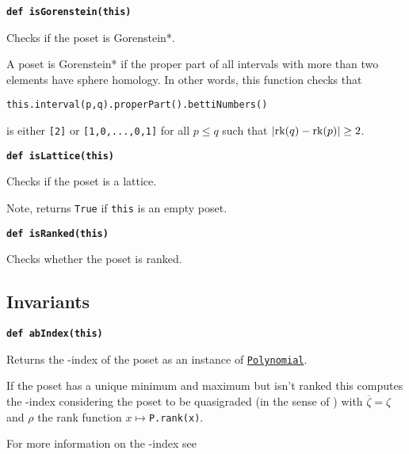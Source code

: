 \documentclass[12pt]{article}
\begin{document}
\begin{child}
\textbf{\hypertarget{Poset.isGorenstein}{\texttt{def isGorenstein(this)}}}
{\list{}{\leftmargin 0.5cm}\item{
Checks if the poset is Gorenstein*.

A poset is Gorenstein* if the proper part of all intervals with more than
two elements have sphere homology. In other words, this function checks that
\begin{center}
        \verb|this.interval(p,q).properPart().bettiNumbers()|
\end{center}
is either \verb|[2]| or \verb|[1,0,...,0,1]| for all $p\le q$ such that $\lvert{\text{rk}(q)-\text{rk}(p)}\rvert\ge2$.


}\endlist}

\textbf{\hypertarget{Poset.isLattice}{\texttt{def isLattice(this)}}}
{\list{}{\leftmargin 0.5cm}\item{
Checks if the poset is a lattice.

Note, returns \verb|True| if \verb|this| is an empty poset.


}\endlist}

\textbf{\hypertarget{Poset.isRanked}{\texttt{def isRanked(this)}}}
{\list{}{\leftmargin 0.5cm}\item{
Checks whether the poset is ranked.


}\endlist}

\subsection{Invariants}
\label{Invariants}

\textbf{\hypertarget{Poset.abIndex}{\texttt{def abIndex(this)}}}
{\list{}{\leftmargin 0.5cm}\item{
Returns the -index of the poset as an instance of \hyperlink{Polynomial}{\texttt{Polynomial}}.

If the poset has a unique minimum and maximum but isn't ranked
this computes the -index considering the poset to be
quasigraded (in the sense of \cite{ehrenborg-goresky-readdy-15}) with $\overline{\zeta}=\zeta$ and $\rho$ the rank function $x\mapsto$\verb|P.rank(x)|. 

For more information on the -index see \cite{bayer-21}


}}
\end{child}
\end{document}
